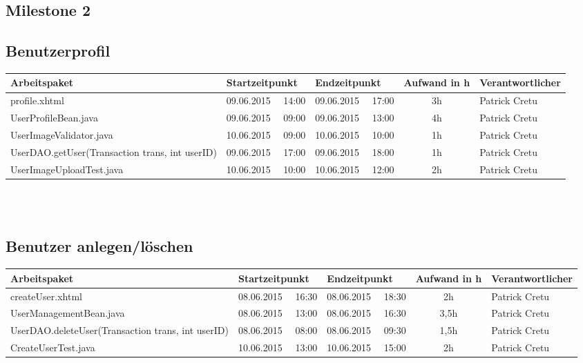 \begin{landscape}
	\section{Milestone 2}
	
	\subsection{Benutzerprofil}
	\begin{tabular}{|p{10.3cm}|p{3.2cm}|p{3.2cm}|c|p{3.5cm}|}
		\hline  \textbf{Arbeitspaket} & \textbf{Startzeitpunkt} & \textbf{Endzeitpunkt} & \textbf{Aufwand in h} & \textbf{Verantwortlicher} \\ 
		\hline   profile.xhtml                                         & 09.06.2015 \ \ 14:00        & 09.06.2015 \ \ 17:00        &  3h                 & Patrick Cretu\\ 
		\hline   UserProfileBean.java                                  & 09.06.2015 \ \ 09:00        & 09.06.2015 \ \ 13:00        &  4h                 & Patrick Cretu\\ 
		\hline   UserImageValidator.java                               & 10.06.2015 \ \ 09:00        & 10.06.2015 \ \ 10:00        &  1h                 & Patrick Cretu\\ 
		\hline   UserDAO.getUser(Transaction trans, int userID)        & 09.06.2015 \ \ 17:00        & 09.06.2015 \ \ 18:00        &  1h                 & Patrick Cretu\\  
		\hline UserImageUploadTest.java & 10.06.2015 \ \ 10:00 & 10.06.2015 \ \ 12:00 & 2h & Patrick Cretu\\
		\hline 
	\end{tabular} \ \\
	\ \\
	
	\subsection{Benutzer anlegen/löschen}
	\begin{tabular}{|p{10.3cm}|p{3.2cm}|p{3.2cm}|c|p{3.5cm}|}
		\hline  \textbf{Arbeitspaket} & \textbf{Startzeitpunkt} & \textbf{Endzeitpunkt} & \textbf{Aufwand in h} & \textbf{Verantwortlicher} \\ 
		\hline   createUser.xhtml                                      & 08.06.2015 \ \ 16:30        & 08.06.2015 \ \ 18:30        &  2h                 & Patrick Cretu\\ 
		\hline   UserManagementBean.java                               & 08.06.2015 \ \ 13:00        & 08.06.2015 \ \ 16:30        &  3,5h               & Patrick Cretu\\ 
		\hline   UserDAO.deleteUser(Transaction trans, int userID)     & 08.06.2015 \ \ 08:00        & 08.06.2015 \ \ 09:30        &  1,5h               & Patrick Cretu\\ 
		\hline CreateUserTest.java & 10.06.2015 \ \ 13:00 & 10.06.2015 \ \ 15:00 & 2h & Patrick Cretu\\
		\hline 
	\end{tabular} \ \\
	\ \\
	

\end{landscape}
